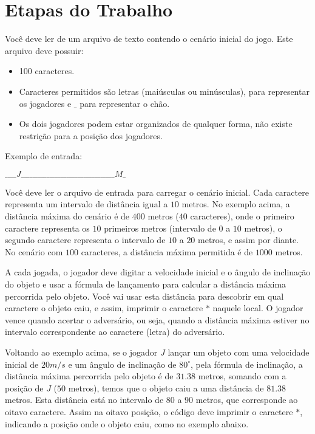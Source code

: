 \documentclass{article}
\begin{document}
\section{Etapas do Trabalho}
Você deve ler de um arquivo de texto contendo o cenário inicial do jogo. Este arquivo deve possuir:
\begin{itemize}
    \item 100 caracteres.
    \item Caracteres permitidos são letras (maiúsculas ou minúsculas), para representar os jogadores e $\_$ para representar o chão.
    \item Os dois jogadores podem estar organizados de qualquer forma, não existe restrição para a posição dos jogadores.
\end{itemize}
    Exemplo de entrada:
    
    \begin{center}
    $\_\_\_\_J\_\_\_\_\_\_\_\_\_\_\_\_\_\_\_\_\_\_\_\_\_\_\_\_\_\_\_\_\_\_\_\_\_M\_$
    \end{center}

    Você deve ler o arquivo de entrada para carregar o cenário inicial. Cada caractere representa um intervalo de distância igual a $10$ metros. No exemplo acima, a distância máxima do cenário é de $400$ metros ($40$ caracteres), onde o primeiro caractere representa os $10$ primeiros metros (intervalo de $0$ a $10$ metros), o segundo caractere representa o intervalo de $10$ a $20$ metros, e assim por diante. No cenário com $100$ caracteres, a distância máxima permitida é de $1000$ metros.
    
    A cada jogada, o jogador deve digitar a velocidade inicial e o ângulo de inclinação do objeto e usar a fórmula de lançamento para calcular a distância máxima percorrida pelo objeto. Você vai usar esta distância para descobrir em qual caractere o objeto caiu, e assim, imprimir o caractere $*$ naquele local. O jogador vence quando acertar o adversário, ou seja, quando a distância máxima estiver no intervalo correspondente ao caractere (letra) do adversário.
    

Voltando ao exemplo acima, se o jogador $J$ lançar um objeto com uma velocidade inicial de $20 m/s$ e um ângulo de inclinação de $80^{\circ}$, pela fórmula de inclinação, a distância máxima percorrida pelo objeto é de $31.38$ metros, somando com a posição de $J$ ($50$ metros), temos que o objeto caiu a uma distância de $81.38$ metros. Esta distância está no intervalo de $80$ a $90$ metros, que corresponde ao oitavo caractere. Assim na oitavo posição, o código deve imprimir o caractere $*$, indicando a posição onde o objeto caiu, como no exemplo abaixo. 
\end{document}
